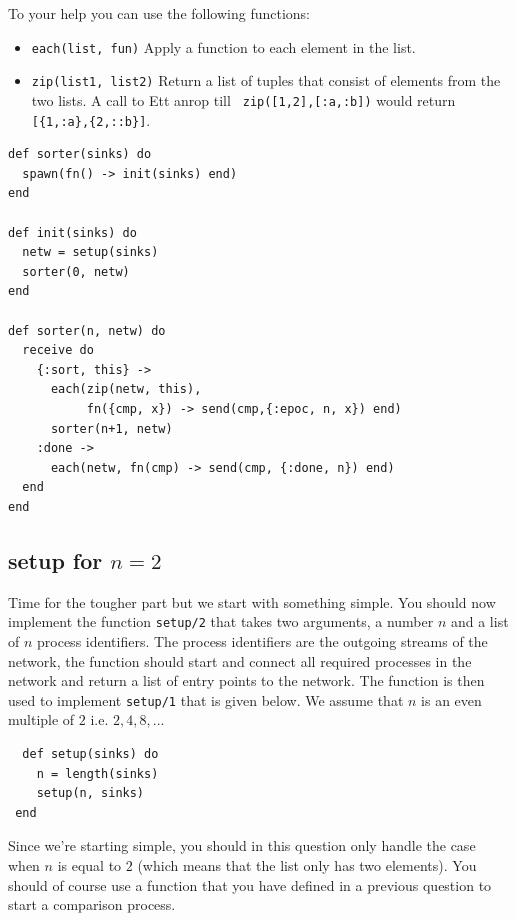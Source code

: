 \documentclass[a4paper,11pt]{article}
\begin{document}
To your help you can use the following functions:

\begin{itemize}
  \item {\tt each(list, fun)}  Apply a function to each element in the list.
  \item {\tt zip(list1, list2)} Return a list of tuples that consist of elements from the two lists. A call to Ett anrop till {\tt
      zip([1,2],[:a,:b])} would return {\tt [\{1,:a\},\{2,::b\}]}.
\end{itemize}



\begin{verbatim}
def sorter(sinks) do
  spawn(fn() -> init(sinks) end)
end
  
def init(sinks) do
  netw = setup(sinks)
  sorter(0, netw)
end

def sorter(n, netw) do
  receive do
    {:sort, this} ->
      each(zip(netw, this), 
           fn({cmp, x}) -> send(cmp,{:epoc, n, x}) end)
      sorter(n+1, netw)
    :done ->
      each(netw, fn(cmp) -> send(cmp, {:done, n}) end)
  end
end
\end{verbatim}

\subsection{setup for $n = 2$ }

Time for the tougher part but we start with something simple. You
  should now implement the function {\tt setup/2} that takes two
  arguments, a number $n$ and a list of $n$ process identifiers. The
  process identifiers are the outgoing streams of the network, the
  function should start and connect all required processes in the
  network and return a list of entry points to the network. The
  function is then used to implement {\tt setup/1} that is given
  below. We assume that $n$ is an even multiple of $2$ i.e. $2,4,8,...$


\begin{verbatim}
  def setup(sinks) do 
    n = length(sinks)
    setup(n, sinks)
 end
\end{verbatim}

Since we're starting simple, you should in this question only handle
  the case when $n$ is equal to $2$ (which means that the list only
  has two elements). You should of course use a function that you have
  defined in a previous question to start a comparison process. 
\end{document}
